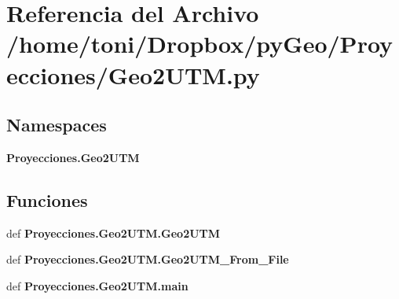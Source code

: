 \section{Referencia del Archivo /home/toni/\-Dropbox/py\-Geo/\-Proyecciones/\-Geo2\-U\-T\-M.py}
\label{Geo2UTM_8py}
\subsection*{Namespaces}
\begin{DoxyCompactItemize}
\item 
{\bf Proyecciones.\-Geo2\-U\-T\-M}
\end{DoxyCompactItemize}
\subsection*{Funciones}
\begin{DoxyCompactItemize}
\item 
def {\bf Proyecciones.\-Geo2\-U\-T\-M.\-Geo2\-U\-T\-M}
\item 
def {\bf Proyecciones.\-Geo2\-U\-T\-M.\-Geo2\-U\-T\-M\-\_\-\-From\-\_\-\-File}
\item 
def {\bf Proyecciones.\-Geo2\-U\-T\-M.\-main}
\end{DoxyCompactItemize}
